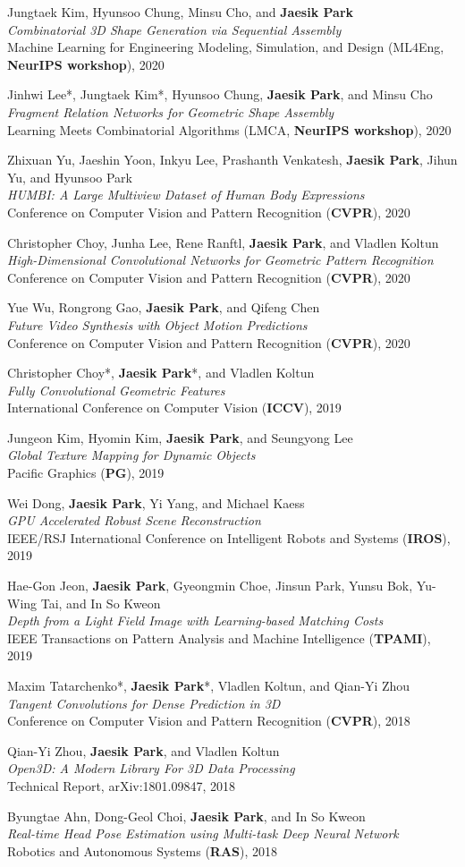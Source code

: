 \documentclass[letterpaper,11pt]{article}
\newcommand{\publicationItem}[3]{
  \small{
  \item{#1\\ \emph{#2}\\ #3\vspace{-2pt}}
  }
}
\begin{document}
    \publicationItem{Jungtaek Kim, Hyunsoo Chung, Minsu Cho, and \textbf{Jaesik Park}}{Combinatorial 3D Shape Generation via Sequential Assembly}{Machine Learning for Engineering Modeling, Simulation, and Design (ML4Eng, \textbf{NeurIPS workshop}), 2020}
    \publicationItem{Jinhwi Lee*, Jungtaek Kim*, Hyunsoo Chung, \textbf{Jaesik Park}, and Minsu Cho}{Fragment Relation Networks for Geometric Shape Assembly}{Learning Meets Combinatorial Algorithms (LMCA, \textbf{NeurIPS workshop}), 2020}
    \publicationItem{Zhixuan Yu, Jaeshin Yoon, Inkyu Lee, Prashanth Venkatesh, \textbf{Jaesik Park}, Jihun Yu, and Hyunsoo Park}{HUMBI: A Large Multiview Dataset of Human Body Expressions}{Conference on Computer Vision and Pattern Recognition (\textbf{CVPR}), 2020}
    \publicationItem{Christopher Choy, Junha Lee, Rene Ranftl, \textbf{Jaesik Park}, and Vladlen Koltun}{High-Dimensional Convolutional Networks for Geometric Pattern Recognition}{Conference on Computer Vision and Pattern Recognition (\textbf{CVPR}), 2020}
    \publicationItem{Yue Wu, Rongrong Gao, \textbf{Jaesik Park}, and Qifeng Chen}{Future Video Synthesis with Object Motion Predictions}{Conference on Computer Vision and Pattern Recognition (\textbf{CVPR}), 2020}
    \publicationItem{Christopher Choy*, \textbf{Jaesik Park}*, and Vladlen Koltun}{Fully Convolutional Geometric Features}{International Conference on Computer Vision (\textbf{ICCV}), 2019}
    \publicationItem{Jungeon Kim, Hyomin Kim, \textbf{Jaesik Park}, and Seungyong Lee}{Global Texture Mapping for Dynamic Objects}{Pacific Graphics (\textbf{PG}), 2019}
    \publicationItem{Wei Dong, \textbf{Jaesik Park}, Yi Yang, and Michael Kaess}{GPU Accelerated Robust Scene Reconstruction}{IEEE/RSJ International Conference on Intelligent Robots and Systems (\textbf{IROS}), 2019}
    \publicationItem{Hae-Gon Jeon, \textbf{Jaesik Park}, Gyeongmin Choe, Jinsun Park, Yunsu Bok, Yu-Wing Tai, and In So Kweon}{Depth from a Light Field Image with Learning-based Matching Costs}{IEEE Transactions on Pattern Analysis and Machine Intelligence (\textbf{TPAMI}), 2019}
    \publicationItem{Maxim Tatarchenko*, \textbf{Jaesik Park}*, Vladlen Koltun, and Qian-Yi Zhou}{Tangent Convolutions for Dense Prediction in 3D}{Conference on Computer Vision and Pattern Recognition (\textbf{CVPR}), 2018}
    \publicationItem{Qian-Yi Zhou, \textbf{Jaesik Park}, and Vladlen Koltun}{Open3D: A Modern Library For 3D Data Processing}{Technical Report, arXiv:1801.09847, 2018}
    \publicationItem{Byungtae Ahn, Dong-Geol Choi, \textbf{Jaesik Park}, and In So Kweon}{Real-time Head Pose Estimation using Multi-task Deep Neural Network}{Robotics and Autonomous Systems (\textbf{RAS}), 2018}
\end{document}
